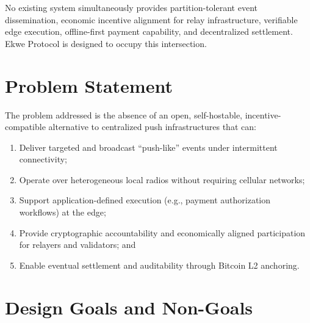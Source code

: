 \documentclass[11pt,a4paper]{article}
\begin{document}
No existing system simultaneously provides partition-tolerant event dissemination, economic incentive alignment for relay infrastructure, verifiable edge execution, offline-first payment capability, and decentralized settlement. Ekwe Protocol is designed to occupy this intersection.

\section{Problem Statement}

The problem addressed is the absence of an open, self-hostable, incentive-compatible alternative to centralized push infrastructures that can:
\begin{enumerate}[label=(\alph*),nosep]
  \item Deliver targeted and broadcast ``push-like'' events under intermittent connectivity;
  \item Operate over heterogeneous local radios without requiring cellular networks;
  \item Support application-defined execution (e.g., payment authorization workflows) at the edge;
  \item Provide cryptographic accountability and economically aligned participation for relayers and validators; and
  \item Enable eventual settlement and auditability through Bitcoin L2 anchoring.
\end{enumerate}

\section{Design Goals and Non-Goals}
\end{document}
